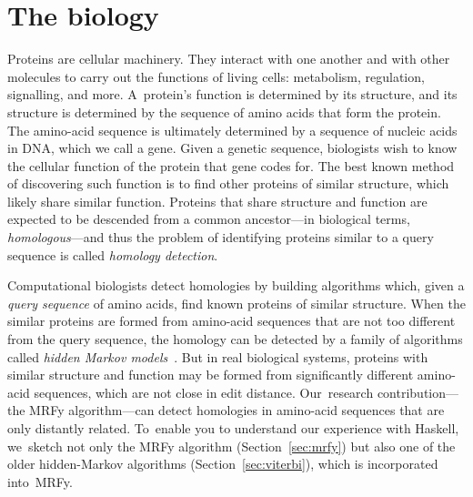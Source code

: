 \documentclass[preprint,nonatbib,blockstyle,nocopyrightspace,times]{sigplanconf}
\newcommand\secref[1]{Section~\ref{sec:#1}}
\let\cite\citep
\begin{document}
\section{The biology}

Proteins are cellular machinery. They interact with one another and with other 
molecules to carry out the functions of living cells: metabolism, regulation, 
signalling, and more.
A~protein's function is determined by its structure, 
and its structure is determined by the sequence of amino acids that
form the protein.
The amino-acid sequence is ultimately determined by a sequence of
nucleic acids in DNA, which we call a gene.
Given a genetic sequence, biologists wish to know the cellular
function of the protein that gene codes for.
The best known method of discovering such function is
to find other proteins of 
similar structure, which likely share similar function.
Proteins that share structure and function are expected to be
descended from a common ancestor---in biological terms, \emph{homologous}---and
thus
the problem of identifying proteins similar to a query sequence is called 
\textit{homology detection}.




Computational biologists detect homologies by building 
algorithms which, given a \emph{query sequence} of amino acids,
find known proteins of similar structure.
When the similar proteins are formed from amino-acid sequences that
are not too different from the query sequence, the homology can be
detected by
a family of algorithms called 
\textit{hidden Markov models}~\cite{Eddy:1998ut}.
But in real biological systems,
proteins with similar structure and function may be formed from significantly 
different amino-acid sequences, which are not close in edit distance.
Our~research contribution---the MRFy algorithm---can detect homologies
in amino-acid sequences that are only distantly related.
%
%
To~enable you to understand our experience with Haskell,
we~sketch not only the MRFy algorithm (\secref{mrfy})
but also one of the older hidden-Markov algorithms (\secref{viterbi}),
which is incorporated into~MRFy.

\end{document}

